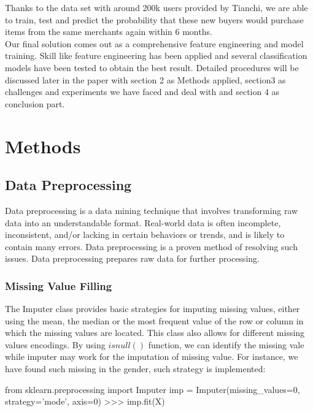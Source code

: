 \documentclass[sigconf]{acmart}
\begin{document}
\indent
Thanks to the data set with around 200k users provided by Tianchi, we are able to train, test and predict the probability that these new buyers would purchase items from the same merchants again within 6 months.\\
\indent
Our final solution comes out as a comprehensive feature engineering and model training. Skill like feature engineering has been applied and several classification models have been tested to obtain the best result. Detailed procedures will be discussed later in the paper with section 2 as Methods applied, section3 as challenges and experiments we have faced and deal with and section 4 as conclusion part.\\

\section{Methods}
\subsection{Data Preprocessing}
Data preprocessing is a data mining technique that involves transforming raw data into an understandable format. Real-world data is often incomplete, inconsistent, and/or lacking in certain behaviors or trends, and is likely to contain many errors. Data preprocessing is a proven method of resolving such issues. Data preprocessing prepares raw data for further processing.\\
\subsubsection{Missing Value Filling}
The Imputer class provides basic strategies for imputing missing values, either using the mean, the median or the most frequent value of the row or column in which the missing values are located. This class also allows for different missing values encodings.
\indent
By using $isnull()$ function, we can identify the missing vale while imputer may work for the imputation of missing value. For instance, we have found such missing in the gender, such strategy is implemented:\\
\begin{python}
from sklearn.preprocessing import Imputer
imp = Imputer(missing_values=0, strategy='mode', axis=0)
>>> imp.fit(X)
\end{python}
\end{document}
